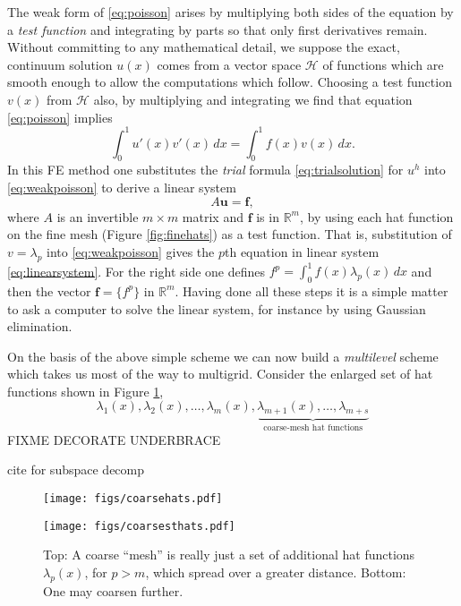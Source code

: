 \documentclass[letterpaper,final,12pt,reqno]{amsart}
\newcommand{\RR}{\mathbb{R}}
\newcommand{\bbf}{\mathbf{f}}
\newcommand{\bu}{\mathbf{u}}
\begin{document}
The weak form of \eqref{eq:poisson} arises by multiplying both sides of the equation by a \emph{test function} and integrating by parts so that only first derivatives remain.  Without committing to any mathematical detail, we suppose the exact, continuum solution $u(x)$ comes from a vector space $\mathcal{H}$ of functions which are smooth enough to allow the computations which follow.  Choosing a test function $v(x)$ from $\mathcal{H}$ also, by multiplying and integrating we find that equation \eqref{eq:poisson} implies
\begin{equation}
\int_0^1 u'(x) v'(x)\,dx = \int_0^1 f(x) v(x)\, dx.
\label{eq:weakpoisson}
\end{equation}
In this FE method one substitutes the \emph{trial} formula \eqref{eq:trialsolution} for $u^h$ into \eqref{eq:weakpoisson} to derive a linear system
\begin{equation}
A \bu = \bbf, \label{eq:linearsystem}
\end{equation}
where $A$ is an invertible $m\times m$ matrix and $\bbf$ is in $\RR^m$, by using each hat function on the fine mesh (Figure \ref{fig:finehats}) as a test function.  That is, substitution of $v=\lambda_p$ into \eqref{eq:weakpoisson} gives the $p$th equation in linear system \eqref{eq:linearsystem}.  For the right side one defines $f^p = \int_0^1 f(x) \lambda_p(x)\,dx$ and then the vector $\bbf = \{f^p\}$ in $\RR^m$.  Having done all these steps it is a simple matter to ask a computer to solve the linear system, for instance by using Gaussian elimination.

On the basis of the above simple scheme we can now build a \emph{multilevel} scheme which takes us most of the way to multigrid.  Consider the enlarged set of hat functions shown in Figure \ref{fig:coarsehats},
    $$\lambda_1(x),\lambda_2(x),\dots,\lambda_m(x),\underbrace{\lambda_{m+1}(x),\dots,\lambda_{m+s}}_{\text{coarse-mesh hat functions}}$$
FIXME DECORATE UNDERBRACE

cite for subspace decomp \cite{Xu1992}

\begin{figure}
\texttt{[image: figs/coarsehats.pdf]}
\medskip

\texttt{[image: figs/coarsesthats.pdf]}
\caption{Top: A coarse ``mesh'' is really just a set of additional hat functions $\lambda_p(x)$, for $p>m$, which spread over a greater distance.  Bottom: One may coarsen further.}
\label{fig:coarsehats}
\end{figure}
\end{document}
